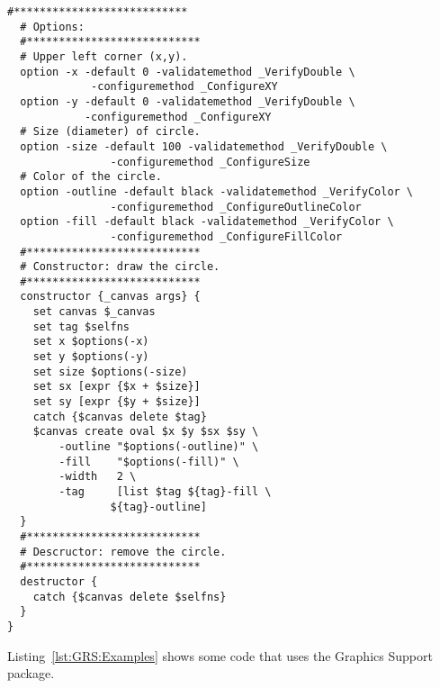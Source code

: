 \begin{lstlisting}[caption={Graphics Support package examples},
		   label={lst:GRS:Examples}]
  #***************************
  # Options:
  #***************************
  # Upper left corner (x,y).
  option -x -default 0 -validatemethod _VerifyDouble \
			 -configuremethod _ConfigureXY
  option -y -default 0 -validatemethod _VerifyDouble \
			-configuremethod _ConfigureXY
  # Size (diameter) of circle.
  option -size -default 100 -validatemethod _VerifyDouble \
			    -configuremethod _ConfigureSize
  # Color of the circle.
  option -outline -default black -validatemethod _VerifyColor \
				-configuremethod _ConfigureOutlineColor
  option -fill -default black -validatemethod _VerifyColor \
				-configuremethod _ConfigureFillColor
  #***************************
  # Constructor: draw the circle.
  #***************************
  constructor {_canvas args} {
    set canvas $_canvas
    set tag $selfns
    set x $options(-x)
    set y $options(-y)
    set size $options(-size)
    set sx [expr {$x + $size}]
    set sy [expr {$y + $size}]
    catch {$canvas delete $tag}
    $canvas create oval $x $y $sx $sy \
		-outline "$options(-outline)" \
		-fill    "$options(-fill)" \
		-width   2 \
		-tag     [list $tag ${tag}-fill \
				${tag}-outline]
  }
  #***************************
  # Descructor: remove the circle.
  #***************************
  destructor {
    catch {$canvas delete $selfns}
  }
}
\end{lstlisting}
Listing~\ref{lst:GRS:Examples} shows some code that uses the Graphics
Support package.
